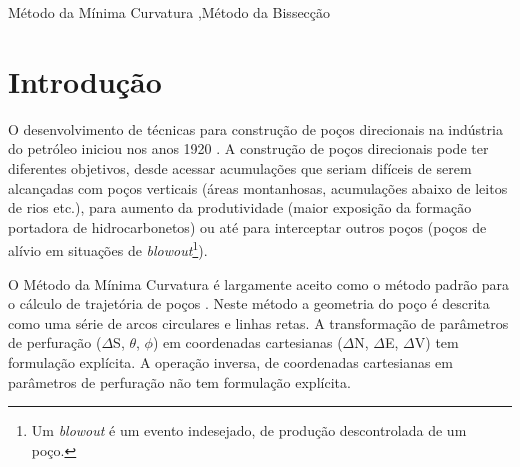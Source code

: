 \documentclass[final,3p,12pt]{elsarticle}
\begin{document}
\begin{frontmatter}
\begin{abstract}
\end{abstract}




\begin{keyword}
    Método da Mínima Curvatura \sep Método da Bissecção 



\end{keyword}

\end{frontmatter}


\section{Introdução}

O desenvolvimento de técnicas para construção de poços direcionais na indústria do petróleo iniciou nos anos 1920 \cite{international2015iadc}. A construção de poços direcionais pode ter diferentes objetivos, desde acessar acumulações que seriam difíceis de serem alcançadas com poços verticais (áreas montanhosas, acumulações abaixo de leitos de rios etc.), para aumento da produtividade (maior exposição da formação portadora de hidrocarbonetos) ou até para interceptar outros poços (poços de alívio em situações de \emph{blowout}\footnote{Um \emph{blowout} é um evento indesejado, de produção descontrolada de um poço.}).

O Método da Mínima Curvatura é largamente aceito como o método padrão para o cálculo de trajetória de poços \cite{10.2118/84246-MS}. Neste método a geometria do poço é descrita como uma série de arcos circulares e linhas retas. A transformação de parâmetros de perfuração ($\Delta$S, $\theta$, $\phi$) em coordenadas cartesianas ($\Delta$N, $\Delta$E, $\Delta$V) tem formulação explícita. A operação inversa, de coordenadas cartesianas em parâmetros de perfuração não tem formulação explícita.
\end{document}
